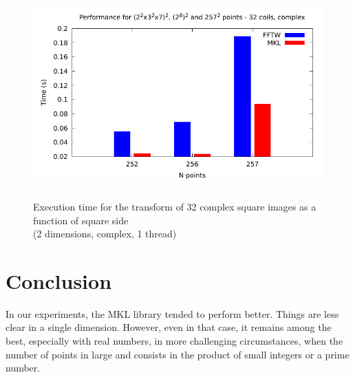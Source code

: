 \documentclass[12pt, a4paper]{article}
\begin{document}
\begin{figure}[H]
\captionsetup{width=0.6\textwidth}
\centering
\includegraphics[height=8cm]{graphs/ccppetmr.pdf}
\caption{Execution time for the transform of 32 complex square images as a function of square side\\(2 dimensions, complex, 1 thread)}
\label{method}
\end{figure}
\section{Conclusion}
In our experiments, the MKL library tended to perform better. Things are less clear in a single dimension. However, even in that case, it remains among the best, especially with real numbers, in more challenging circumstances, when the number of points in large and consists in the product of small integers or a prime number.  
\end{document}
